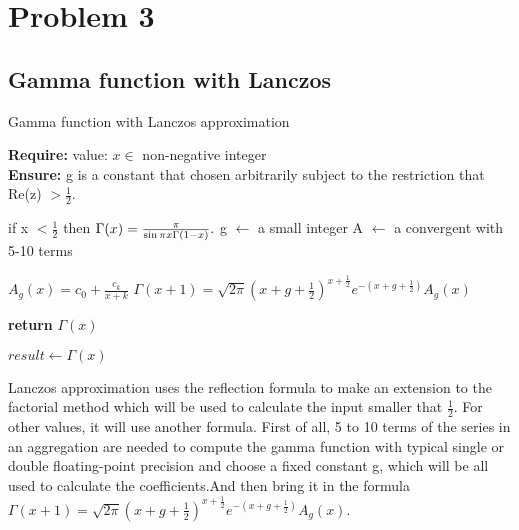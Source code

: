 \documentclass[a4paper, 11pt]{article}
\begin{document}
\section{Problem 3}
\subsection{Gamma function with Lanczos}
\begin{algorithm}

\caption{Gamma function with Lanczos approximation}

\textbf{Require:}  value: $x \in $ non-negative integer \\
\textbf{Ensure:} g is a constant that chosen arbitrarily subject to the restriction that Re(z) $>\frac{1}{2}$.
\begin{algorithmic}[1]

    \State if x $< \frac{1}{2}$ then
    \State \indent $\Gamma (x)={\pi  \over \sin \pi x \Gamma (1-x)}.$  
    \State g $\leftarrow$  a small integer
    \State A $\leftarrow$ a convergent with 5-10 terms 
    
    
    \State $A_{g}(x)=c_{0}+{\frac  {c_{k}}{x+k}}$
    \EndFor
    \State ${\displaystyle \Gamma (x+1)={\sqrt {2\pi }}{\left(x+g+{\tfrac {1}{2}}\right)}^{x+{\frac {1}{2}}}e^{-\left(x+g+{\frac {1}{2}}\right)}A_{g}(x)}$
    
    \State \textbf{return} $\Gamma (x)$
    \EndProcedure
\Statex

\State $result \leftarrow \Gamma (x)$ 

\end{algorithmic}
\end{algorithm}

Lanczos approximation uses the  reflection formula to make an extension to the factorial method which will be used to calculate the input smaller that $\frac{1}{2}$. For other values, it will use another formula. First of all, 5 to 10 terms of the series in an aggregation are needed to compute the gamma function with typical single or double floating-point precision and choose a fixed constant g, which will be all used to calculate the coefficients.And then bring it in the formula ${\displaystyle \Gamma (x+1)={\sqrt {2\pi }}{\left(x+g+{\tfrac {1}{2}}\right)}^{x+{\frac {1}{2}}}e^{-\left(x+g+{\frac {1}{2}}\right)}A_{g}(x)}$.
\end{document}

